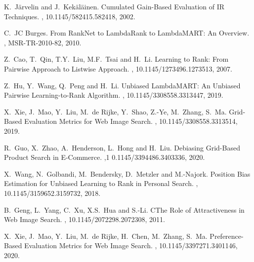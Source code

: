 \documentclass[11pt]{article}
\begin{document}
\begin{thebibliography}{10}
\itemsep=1pt
\begin{small}

 K.~J\"{a}rvelin and J.~Kek\"{a}l\"{a}inen. \newblock Cumulated Gain-Based Evaluation of IR Techniques. , 10.1145/582415.582418, 2002.

 C.~JC Burges. \newblock From RankNet to LambdaRank to LambdaMART: An Overview. , MSR-TR-2010-82, 2010.

 Z.~Cao, T.~Qin, T.Y.~Liu, M.F.~Tsai and H.~Li. \newblock Learning to Rank: From Pairwise Approach to Listwise Approach. , 10.1145/1273496.1273513, 2007.

  Z.~Hu, Y.~Wang, Q.~Peng and H.~Li. \newblock Unbiased LambdaMART: An Unbiased Pairwise Learning-to-Rank Algorithm. , 10.1145/3308558.3313447, 2019.

 X.~Xie, J.~Mao, Y.~Liu, M.~de Rijke, Y.~Shao, Z.-Ye, M.~Zhang, S.~Ma. \newblock Grid-Based Evaluation Metrics for Web Image Search. , 10.1145/3308558.3313514, 2019.

 R.~Guo, X.~Zhao, A.~Henderson, L.~Hong and H.~Liu. \newblock Debiasing Grid-Based Product Search in E-Commerce. ,1 0.1145/3394486.3403336, 2020.

 X.~Wang, N.~Golbandi, M.~Bendersky, D.~Metzler and M.-Najork. \newblock Position Bias Estimation for Unbiased Learning to Rank in Personal Search. , 10.1145/3159652.3159732, 2018.

 B.~Geng, L.~Yang, C.~Xu, X.S.~Hua and S.-Li. \newblock CThe Role of Attractiveness in Web Image Search. , 10.1145/2072298.2072308, 2011.

 X.~Xie, J.~Mao, Y.~Liu, M.~de Rijke, H.~Chen, M.~Zhang, S.~Ma. \newblock Preference-Based Evaluation Metrics for Web Image Search. , 10.1145/3397271.3401146, 2020.


\end{small}
\end{thebibliography}
\end{document}
